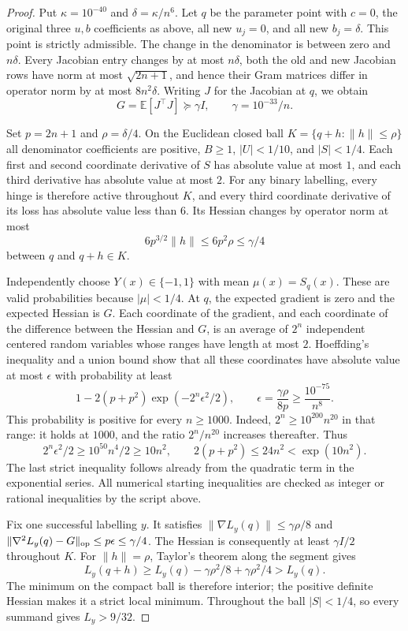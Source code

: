 \documentclass[11pt]{article}
\begin{document}
\begin{proof}
Put $\kappa=10^{-40}$ and $\delta=\kappa/n^6$. Let $q$ be the parameter
point with $c=0$, the original three $u,b$ coefficients as above, all
new $u_j=0$, and all new $b_j=\delta$. This point is strictly admissible.
The change in the denominator is between zero and $n\delta$.
Every Jacobian entry changes by at most $n\delta$, both the old and
new Jacobian rows have norm at most $\sqrt{2n+1}$, and hence their
Gram matrices differ in operator norm by at most $8n^2\delta$.
Writing $J$ for the Jacobian at $q$, we obtain
\[
 G=\mathbb E[J^{\top}J]\succeq\gamma I,
 \qquad\gamma=10^{-33}/n.
\]

Set $p=2n+1$ and $\rho=\delta/4$. On the Euclidean closed ball
$K=\{q+h:\|h\|\le\rho\}$ all denominator coefficients are positive,
$B\ge1$, $|U|<1/10$, and $|S|<1/4$.
Each first and second coordinate derivative of $S$ has absolute value
at most $1$, and each third derivative has absolute value at most $2$.
For any binary labelling, every hinge is therefore active throughout
$K$, and every third coordinate derivative of its loss has absolute
value less than $6$. Its Hessian changes by operator norm at most
\[
 6p^{3/2}\|h\|\le6p^2\rho\le\gamma/4
\]
between $q$ and $q+h\in K$.

Independently choose $Y(x)\in\{-1,1\}$ with mean
$\mu(x)=S_q(x)$. These are valid probabilities because $|\mu|<1/4$.
At $q$, the expected gradient is zero and the expected Hessian is $G$.
Each coordinate of the gradient, and each coordinate of the difference
between the Hessian and $G$, is an average of $2^n$ independent centered
random variables whose ranges have length at most $2$. Hoeffding's
inequality and a union bound show that all these coordinates have
absolute value at most $\epsilon$ with probability at least
\[
 1-2(p+p^2)\exp(-2^n\epsilon^2/2),\qquad
 \epsilon=\frac{\gamma\rho}{8p}\ge\frac{10^{-75}}{n^8}.
\]
This probability is positive for every $n\ge1000$. Indeed,
$2^n\ge10^{200}n^{20}$ in that range: it holds at $1000$, and the ratio
$2^n/n^{20}$ increases thereafter. Thus
\[
 2^n\epsilon^2/2\ge10^{50}n^4/2\ge10n^2,
 \qquad 2(p+p^2)\le24n^2<\exp(10n^2).
\]
The last strict inequality follows already from the quadratic term in
the exponential series. All numerical starting inequalities are checked
as integer or rational inequalities by the script above.

Fix one successful labelling $y$. It satisfies
$\|\nabla L_y(q)\|\le\gamma\rho/8$ and
$\|\nabla^2L_y(q)-G\|_{\rm op}\le p\epsilon\le\gamma/4$.
The Hessian is consequently at least $\gamma I/2$ throughout $K$.
For $\|h\|=\rho$, Taylor's theorem along the segment gives
\[
 L_y(q+h)\ge L_y(q)-\gamma\rho^2/8+\gamma\rho^2/4>L_y(q).
\]
The minimum on the compact ball is therefore interior; the positive
definite Hessian makes it a strict local minimum. Throughout the ball
$|S|<1/4$, so every summand gives $L_y>9/32$.


\end{proof}
\end{document}
